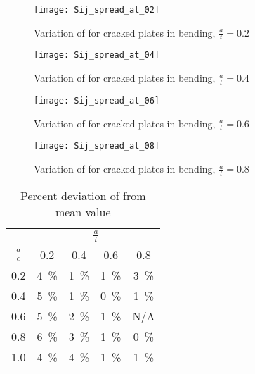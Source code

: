 \begin{figure}[tbp]
\centering
\texttt{[image: Sij\_spread\_at\_02]}
\caption{Variation of \Sij for cracked plates in bending, \(\frac{a}{t}=0.2\) \label{fig:Sij_spread_at_02}}
\end{figure}
\begin{figure}[tbp]
\centering
\texttt{[image: Sij\_spread\_at\_04]}
\caption{Variation of \Sij for cracked plates in bending, \(\frac{a}{t}=0.4\) \label{fig:Sij_spread_at_04}}
\end{figure}
\begin{figure}[tbp]
\centering
\texttt{[image: Sij\_spread\_at\_06]}
\caption{Variation of \Sij for cracked plates in bending, \(\frac{a}{t}=0.6\) \label{fig:Sij_spread_at_06}}
\end{figure}
\begin{figure}[tbp]
\centering
\texttt{[image: Sij\_spread\_at\_08]}
\caption{Variation of \Sij for cracked plates in bending, \(\frac{a}{t}=0.8\) \label{fig:Sij_spread_at_08}}
\end{figure}

\begin{table}
\caption{\label{tab:Sij_percentage_grid} Percent deviation of \Sij from mean value}
\centering
\begin{tabular}{SSSSS}
\toprule
&  \\
 & 0.2              & 0.4              & 0.6              & 0.8 \\ \cmidrule(lr){1-1} \cmidrule(lr){2-5}
0.2     & \SI{4}{\percent} & \SI{1}{\percent} & \SI{1}{\percent} & \SI{3}{\percent} \\
0.4     & \SI{5}{\percent} & \SI{1}{\percent} & \SI{0}{\percent} & \SI{1}{\percent} \\
0.6     & \SI{5}{\percent} & \SI{2}{\percent} & \SI{1}{\percent} & {N/A} \\
0.8     & \SI{6}{\percent} & \SI{3}{\percent} & \SI{1}{\percent} & \SI{0}{\percent} \\
1.0     & \SI{4}{\percent} & \SI{4}{\percent} & \SI{1}{\percent} & \SI{1}{\percent} \\ \bottomrule
\end{tabular}
\end{table}

